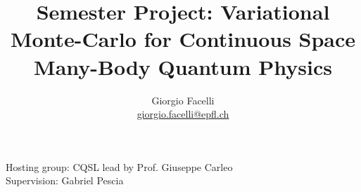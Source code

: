 \documentclass[a4paper, 12pt, oneside]{article}
\newcommand{\mail}[1]{{\href{mailto:#1}{#1}}}
\begin{document}
\title{Semester Project: Variational Monte-Carlo for Continuous Space Many-Body Quantum Physics}
\author{Giorgio Facelli\\ 
{\small \mail{giorgio.facelli@epfl.ch}}}

\maketitle %
\begin{center}
Hosting group: CQSL lead by Prof. Giuseppe Carleo \\
Supervision: Gabriel Pescia
\end{center}
\baselineskip=16pt
\parindent=0pt
\parskip=12pt
\end{document}
